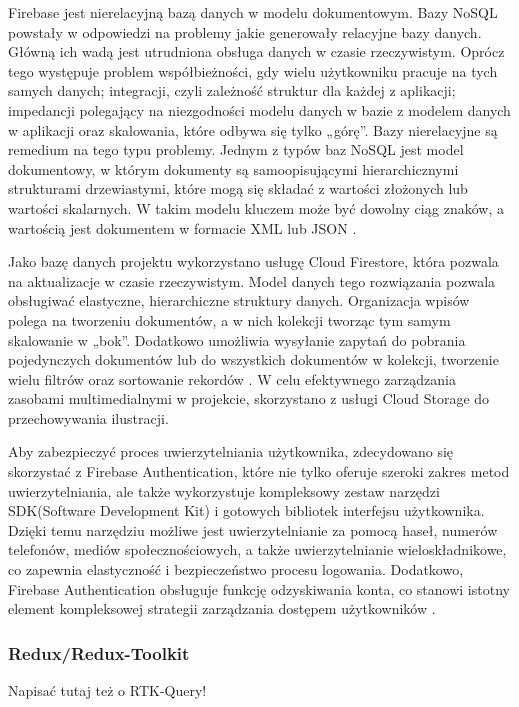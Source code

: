 Firebase jest nierelacyjną bazą danych w modelu dokumentowym. Bazy NoSQL powstały w odpowiedzi na problemy jakie generowały relacyjne bazy danych. Główną ich wadą jest utrudniona obsługa danych w czasie rzeczywistym. Oprócz tego występuje problem współbieżności, gdy wielu użytkowniku pracuje na tych samych danych; integracji, czyli zależność struktur dla każdej z aplikacji; impedancji polegający na niezgodności modelu danych w bazie z modelem danych w aplikacji oraz skalowania, które odbywa się tylko „górę”. Bazy nierelacyjne są remedium na tego typu problemy. Jednym z typów baz NoSQL jest model dokumentowy, w którym dokumenty są samoopisującymi hierarchicznymi strukturami drzewiastymi, które mogą się składać z wartości złożonych lub wartości skalarnych. W takim modelu kluczem może być dowolny ciąg znaków, a wartością jest dokumentem w formacie XML lub JSON \cite{nosql}.

Jako bazę danych projektu wykorzystano usługę Cloud Firestore, która pozwala na aktualizacje w czasie rzeczywistym. Model danych tego rozwiązania pozwala obsługiwać elastyczne, hierarchiczne struktury danych. Organizacja wpisów polega na tworzeniu dokumentów, a w nich kolekcji tworząc tym samym skalowanie w „bok”. Dodatkowo umożliwia wysyłanie zapytań do pobrania pojedynczych dokumentów lub do wszystkich dokumentów w kolekcji, tworzenie wielu filtrów oraz sortowanie rekordów \cite{storage}. W celu efektywnego zarządzania zasobami multimedialnymi w projekcie, skorzystano z usługi Cloud Storage do przechowywania ilustracji.

Aby zabezpieczyć proces uwierzytelniania użytkownika, zdecydowano się skorzystać z Firebase Authentication, które nie tylko oferuje szeroki zakres metod uwierzytelniania, ale także wykorzystuje kompleksowy zestaw narzędzi SDK(Software Development Kit) i gotowych bibliotek interfejsu użytkownika. Dzięki temu narzędziu możliwe jest uwierzytelnianie za pomocą haseł, numerów telefonów, mediów społecznościowych, a także uwierzytelnianie wieloskładnikowe, co zapewnia elastyczność i bezpieczeństwo procesu logowania. Dodatkowo, Firebase Authentication obsługuje funkcję odzyskiwania konta, co stanowi istotny element kompleksowej strategii zarządzania dostępem użytkowników \cite{authenticationase}.


\subsubsection*{\textbf{Redux/Redux-Toolkit}}
\phantom{th}
Napisać tutaj też o RTK-Query!

